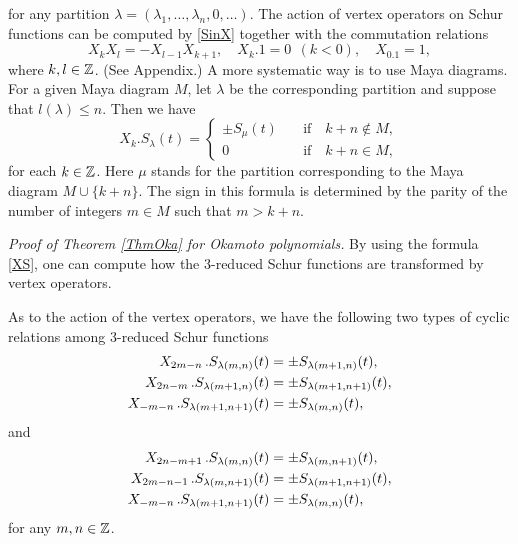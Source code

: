for any partition $\lambda=(\lambda_1,\ldots,\lambda_n,0,\ldots)$.
The action of vertex operators on Schur functions can be 
computed by \eqref{SinX} together with the commutation relations
\begin{equation}\label{comXX}
X_kX_l=-X_{l-1}X_{k+1}, \quad X_k.1=0\ \ (k<0),\quad X_0.1=1,
\end{equation}
where $k, l\in{\Bbb Z}$. (See Appendix.) 
A more systematic way is to use Maya diagrams. 
For a given Maya diagram $M$, 
let $\lambda$ be the corresponding partition and suppose that
$l(\lambda)\le n$. 
Then we have 
\begin{equation}\label{XS}
X_k.S_\lambda(t)=
\left\{
\begin{array}{cc}
\pm S_\mu(t)\quad&\mbox{if}\quad k+n\notin M,\\
0\quad&\mbox{if}\quad k+n\in M,
\end{array}\right.
\end{equation}
for each $k\in{\Bbb Z}$. 
Here $\mu$ stands for  the partition corresponding to the 
Maya diagram $M\cup\{k+n\}$.  The sign in this formula 
is determined by the parity of the number of integers 
$m\in M$ such that $m>k+n$. 
\par\medskip
\noindent
{\em Proof of Theorem \ref{ThmOka} for Okamoto polynomials.}\quad 
By using the formula \eqref{XS}, one can compute how the 
3-reduced Schur functions are transformed by vertex operators. 
\begin{lem}\label{Lem53}
As to the action of the vertex operators, 
we have the following two types of cyclic relations among 
3-reduced Schur functions
\begin{align}\label{cyc1}
X_{2m-n}\,.S_{\lambda(m,n)}(t)&=\pm S_{\lambda(m+1,n)}(t),\notag\\
X_{2n-m}\,.S_{\lambda(m+1,n)}(t)&=\pm S_{\lambda(m+1,n+1)}(t),\\
X_{-m-n}\,.S_{\lambda(m+1,n+1)}(t)&=\pm S_{\lambda(m,n)}(t),\notag
\end{align}
and 
\begin{align}
X_{2n-m+1}\,.S_{\lambda(m,n)}(t)&=\pm S_{\lambda(m,n+1)}(t),\notag\\
X_{2m-n-1}\,.S_{\lambda(m,n+1)}(t)&=\pm S_{\lambda(m+1,n+1)}(t),\\
X_{-m-n}\,.S_{\lambda(m+1,n+1)}(t)&=\pm S_{\lambda(m,n)}(t),\notag
\end{align}
for any $m,n\in{\Bbb Z}$. 
\end{lem}
\par\noindent
